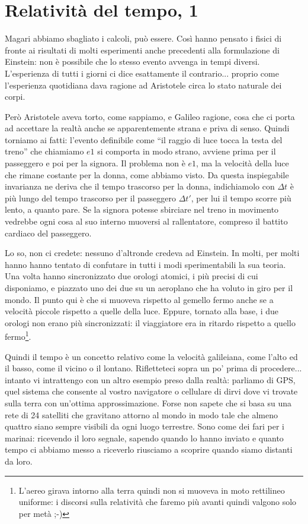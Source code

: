 \section{Relatività del tempo, 1}

Magari abbiamo sbagliato i calcoli, può essere. Così hanno pensato i fisici di fronte ai risultati di molti esperimenti anche precedenti alla formulazione di Einstein: non è possibile che lo stesso evento avvenga in tempi diversi. L'esperienza di tutti i giorni ci dice esattamente il contrario... proprio come l'esperienza quotidiana dava ragione ad Aristotele circa lo stato naturale dei corpi.

Però Aristotele aveva torto, come sappiamo, e Galileo ragione, cosa che ci porta ad accettare la realtà anche se apparentemente strana e priva di senso. Quindi torniamo ai fatti: l'evento definibile come “il raggio di luce tocca la testa del treno” che chiamiamo $e1$ si comporta in modo strano, avviene prima per il passeggero e poi per la signora. Il problema non è $e1$, ma la velocità della luce che rimane costante per la donna, come abbiamo visto. Da questa inspiegabile invarianza ne deriva che il tempo trascorso per la donna, indichiamolo con $\Delta t$ è più lungo del tempo trascorso per il passeggero $\Delta t'$, per lui il tempo scorre più lento, a quanto pare. Se la signora potesse sbirciare nel treno in movimento vedrebbe ogni cosa al suo interno muoversi al rallentatore, compreso il battito cardiaco del passeggero.

Lo so, non ci credete: nessuno d'altronde credeva ad Einstein. In molti, per molti hanno hanno tentato di confutare in tutti i modi sperimentabili la sua teoria. Una volta hanno sincronizzato due orologi atomici, i più precisi di cui disponiamo, e piazzato uno dei due su un aeroplano che ha voluto in giro per il mondo. Il punto qui è che si muoveva rispetto al gemello fermo anche se a velocità piccole rispetto a quelle della luce. Eppure, tornato alla base, i due orologi non erano più sincronizzati: il viaggiatore era in ritardo rispetto a quello fermo\footnote{L'aereo girava intorno alla terra quindi non si muoveva in moto rettilineo uniforme: i discorsi sulla relatività che faremo più avanti quindi valgono solo per metà ;-)}.

Quindi il tempo è un concetto relativo come la velocità galileiana, come l'alto ed il basso, come il vicino o il lontano. Rifletteteci sopra un po' prima di procedere... intanto vi intrattengo con un altro esempio preso dalla realtà: parliamo di GPS, quel sistema che consente al vostro navigatore o cellulare di dirvi dove vi trovate sulla terra con un'ottima approssimazione. Forse non sapete che si basa su una rete di 24 satelliti che gravitano attorno al mondo in modo tale che almeno quattro siano sempre visibili da ogni luogo terrestre. Sono come dei fari per i marinai: ricevendo il loro segnale, sapendo quando lo hanno inviato e quanto tempo ci abbiamo messo a riceverlo riusciamo a scoprire quando siamo distanti da loro. 


